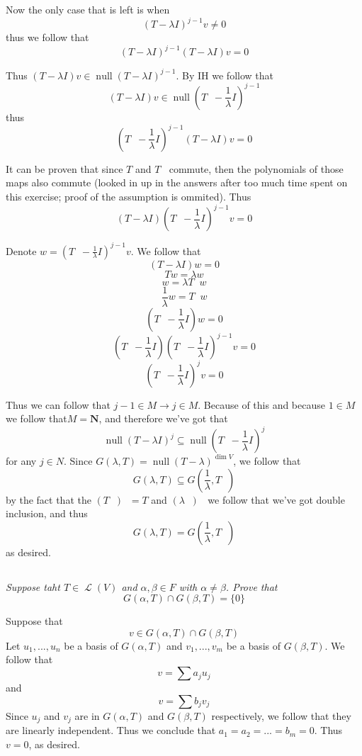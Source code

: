 \documentclass[11pt,oneside,titlepage]{book}
\DeclareMathOperator \map {\mathcal {L}}
\DeclareMathOperator \ns {null}
\DeclareMathOperator \inv {^{-1}}
\begin{document}
Now the only case that is left is when
$$(T - \lambda I)^{j - 1} v \neq 0$$
thus we follow that
$$(T - \lambda I)^{j - 1}(T - \lambda I) v = 0$$

Thus $(T - \lambda I)v \in \ns (T - \lambda I)^{j - 1}$. By IH we follow that
$$(T - \lambda I)v \in \ns (T\inv - \frac{1}{\lambda} I)^{j - 1}$$
thus
$$(T\inv - \frac{1}{\lambda} I)^{j - 1}(T - \lambda I) v = 0$$

It can be proven
that since $T $ and $T \inv$ commute, then the polynomials of those maps also commute
(looked in up in the answers after too much time spent on this exercise;
proof of the assumption is ommited). Thus 
$$(T - \lambda I) (T\inv - \frac{1}{\lambda} I)^{j - 1}v = 0$$

Denote $w = (T\inv - \frac{1}{\lambda} I)^{j - 1}v$. We follow that
$$(T - \lambda I) w = 0$$
$$Tw = \lambda w$$
$$w = \lambda T \inv w$$
$$\frac{1}{\lambda} w = T \inv w$$
$$ (T \inv - \frac{1}{\lambda} I)  w = 0$$
$$ (T \inv - \frac{1}{\lambda} I) (T\inv - \frac{1}{\lambda} I)^{j - 1}v  = 0$$
$$ (T\inv - \frac{1}{\lambda} I)^j v  = 0$$

Thus we can follow that $j - 1 \in M \to j \in M$. Because of this and because
$1 \in M$ we follow that$M = \textbf{N}$, and therefore
we've got that
$$\ns (T - \lambda I)^j \subseteq \ns (T\inv - \frac{1}{\lambda} I)^j$$
for any $j \in N$. Since $G(\lambda, T) = \ns (T - \lambda)^{\dim V}$, we follow that
$$G(\lambda, T) \subseteq G(\frac{1}{\lambda}, T\inv)$$
by the fact that the $(T\inv)\inv = T$ and $(\lambda \inv)\inv$ we follow that we've got double
inclusion, and thus
$$G(\lambda, T) = G(\frac{1}{\lambda}, T\inv)$$
as desired.

\subsection{}

\textit{Suppose taht $T \in \map(V)$ and $\alpha, \beta \in F$ with $\alpha \neq \beta$.
  Prove that
  $$G(\alpha, T) \cap G(\beta, T) = \{0\}$$}

Suppose that
$$v \in G(\alpha, T) \cap G(\beta, T)$$
Let $u_1, ..., u_n$ be a basis of $G(\alpha, T)$ and $v_1, ..., v_m$ be a basis of $G(\beta, T)$.
We follow that
$$v = \sum a_j u_j$$
and
$$v = \sum b_j v_j$$
Since $u_j$ and $v_j$ are in $G(\alpha, T)$ and $G(\beta, T)$ respectively, we follow that
they are linearly independent. Thus we conclude that $a_1 = a_2 = ... = b_m = 0$. Thus $v = 0$,
as desired.

\subsection{}
\end{document}
